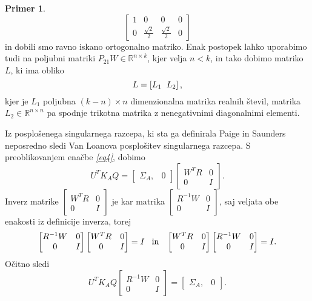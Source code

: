 \documentclass[mat1]{article}
\theoremstyle{definition}
\newtheorem{primer}{Primer}[section]
\begin{document}
\begin{primer}
$$\begin{bmatrix}
1 & 0 & 0 & 0 \\
0 & \frac{\sqrt{2}}{2} & \frac{\sqrt{2}}{2} & 0
\end{bmatrix}
$$
in dobili smo ravno iskano ortogonalno matriko. Enak postopek lahko uporabimo tudi na poljubni matriki $P_{21}W \in \mathbb{R}^{n \times k}$, kjer velja $n < k$, in tako dobimo matriko $L$, ki ima obliko 
$$ L =
\left[ L_1 \hspace{2mm} L_2 \right]
\text{,} $$ kjer je $L_1$ poljubna $(k-n) \times n$ dimenzionalna matrika realnih števil, matrika $L_2 \in \mathbb{R}^{n \times n}$ pa spodnje trikotna matrika z nenegativnimi diagonalnimi elementi.
\end{primer}

Iz posplošenega singularnega razcepa, ki sta ga definirala Paige in Saunders neposredno sledi Van Loanova posplošitev singularnega razcepa. 
S preoblikovanjem enačbe \textit{\eqref{eq4}}, dobimo
$$U^T K_A Q = \left[\begin{array}{cc} \Sigma_A, & 0 \end{array}\right]
\begin{bmatrix}
W^TR & 0 \\
0 & I 
\end{bmatrix} \text{.}$$
Inverz matrike
$\begin{bmatrix}
W^TR & 0 \\
0 & I 
\end{bmatrix} $
je kar matrika 
$\begin{bmatrix}
R^{-1} W & 0 \\
0 & I 
\end{bmatrix} \text{,}$
saj veljata obe enakosti iz definicije inverza, torej
$$\begin{bmatrix}
R^{-1} W & 0 \\
0 & I 
\end{bmatrix}
\begin{bmatrix}
W^TR & 0 \\
0 & I 
\end{bmatrix}
= I \hspace{3mm}\text{in} \hspace{3mm}
\begin{bmatrix}
W^TR & 0 \\
0 & I 
\end{bmatrix}
\begin{bmatrix}
R^{-1} W & 0 \\
0 & I 
\end{bmatrix}
= I \text{.}$$
Očitno sledi
$$ U^T K_A Q
\begin{bmatrix}
R^{-1} W & 0 \\
0 & I 
\end{bmatrix}
=
\left[\begin{array}{cc} \Sigma_A, & 0 \end{array}\right] \text{.}
$$
\end{document}
